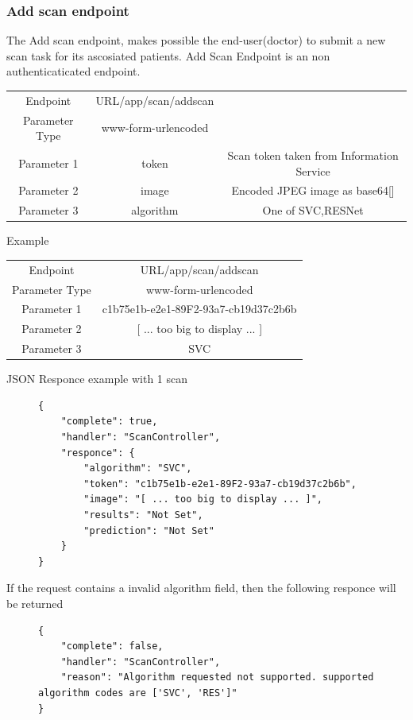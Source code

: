				\subsubsection{Add scan endpoint}
					\label{add-scan-taskbe}
					The Add scan  endpoint, makes possible the end-user(doctor) to submit a new scan task for its ascosiated patients.
					Add Scan Endpoint is an non authenticaticated endpoint.
					\begin{center}
						\begin{tabular}{ |c|c|c| } 
							\hline
							Endpoint & {{URL}}/app/scan/addscan& \\
							Parameter Type & www-form-urlencoded  &\\
							Parameter 1 & token  &Scan token taken from Information Service\\
							Parameter 2 & image  &Encoded JPEG image as base64[\cite{base64-4648}]\\
							Parameter 3 & algorithm  & One of {SVC,RESNet}\\
							\hline
						\end{tabular}
					\end{center}
					Example
					\begin{center}
						\begin{tabular}{ |c|c| } 
							\hline
							Endpoint & {{URL}}/app/scan/addscan \\
							Parameter Type & www-form-urlencoded  \\
							Parameter 1 & c1b75e1b-e2e1-89F2-93a7-cb19d37c2b6b   \\
							Parameter 2 & [ ... too big to display ... ]  \\
							Parameter 3 & SVC\\
							\hline
						\end{tabular}
					\end{center}
					JSON Responce example with 1 scan
					\begin{figure}[H]
						\iftrue
						\begin{lstlisting}[]
{
	"complete": true,
	"handler": "ScanController",
	"responce": {
		"algorithm": "SVC",
		"token": "c1b75e1b-e2e1-89F2-93a7-cb19d37c2b6b",
		"image": "[ ... too big to display ... ]",
		"results": "Not Set",
		"prediction": "Not Set"
	}
}
						\end{lstlisting}
					\end{figure}
					If the request contains a invalid algorithm field, then the following responce will be returned
					\begin{figure}[H]
						\iftrue
						\begin{lstlisting}[]
{
	"complete": false,
	"handler": "ScanController",
	"reason": "Algorithm requested not supported. supported algorithm codes are ['SVC', 'RES']"
}
						\end{lstlisting}
					\end{figure}
